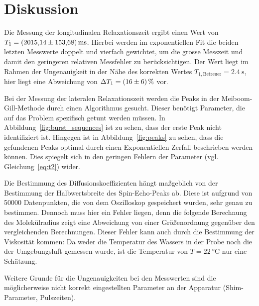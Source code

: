 \section{Diskussion}%
\label{sec:diskussion}
Die Messung der longitudinalen Relaxationszeit
ergibt einen Wert von $T_1 = \SI{2015.14 \pm 153.68}{\milli\second}$.
Hierbei werden im exponentiellen Fit die beiden letzten Messwerte doppelt und vierfach gewichtet,
um die grosse Messzeit und damit den geringeren relativen Messfehler zu berücksichtigen.
Der Wert liegt im Rahmen der Ungenauigkeit in der Nähe des korrekten Wertes
$T_{1, \text{Betreuer}} = \SI{2.4}{\second}$\cite{t1betreuer},
hier liegt eine Abweichung von $\Delta T_1 = \SI{16\pm6}{\percent}$ vor.

Bei der Messung der lateralen Relaxationszeit werden die Peaks in der Meiboom-Gill-Methode
durch einen Algorithmus gesucht.
Dieser benötigt Parameter, die auf das Problem spezifisch getunt werden müssen.
In Abbildung~\ref{fig:burst_sequences} ist zu sehen, dass der erste Peak nicht identifiziert ist.
Hingegen ist in Abbildung~\ref{fig:peaks} zu sehen, dass die gefundenen Peaks
optimal durch einen Exponentiellen Zerfall beschrieben werden können.
Dies spiegelt sich in den geringen Fehlern der Parameter (vgl. Gleichung~\eqref{eq:t2}) wider.

Die Bestimmung des Diffusionskoeffizienten hängt maßgeblich von der Bestimmung der Halbwertsbreite des
Spin-Echo-Peaks ab.
Diese ist aufgrund von \num{50000} Datenpunkten, die von dem Oszilloskop gespeichert wurden, sehr genau zu bestimmen.
Dennoch muss hier ein Fehler liegen, denn die folgende Berechnung des Molekülradius
zeigt eine Abweichung von einer Größenordnung gegenüber den vergleichenden Berechnungen.
Dieser Fehler kann auch durch die Bestimmung der Viskosität kommen:
Da weder die Temperatur des Wassers in der Probe noch die der Umgebungsluft gemessen wurde,
ist die Temperatur von $T = \SI{22}{\celsius}$ nur eine Schätzung.

Weitere Grunde für die Ungenauigkeiten bei den Messwerten sind die
möglicherweise nicht korrekt eingestellten Parameter an der Apparatur
(Shim-Parameter, Pulszeiten).
